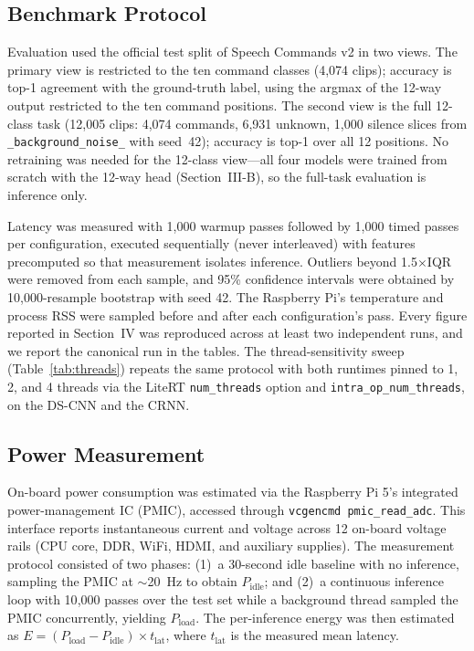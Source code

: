 \documentclass[conference,a4paper]{IEEEtran}
\begin{document}
\subsection{Benchmark Protocol}

Evaluation used the official test split of Speech Commands v2 in two views. The primary view is restricted to the ten command classes (4{,}074 clips); accuracy is top-1 agreement with the ground-truth label, using the argmax of the 12-way output restricted to the ten command positions. The second view is the full 12-class task (12{,}005 clips: 4{,}074 commands, 6{,}931 unknown, 1{,}000 silence slices from \texttt{\_background\_noise\_} with seed~42); accuracy is top-1 over all 12 positions. No retraining was needed for the 12-class view---all four models were trained from scratch with the 12-way head (Section~III-B), so the full-task evaluation is inference only.

Latency was measured with 1{,}000 warmup passes followed by 1{,}000 timed passes per configuration, executed sequentially (never interleaved) with features precomputed so that measurement isolates inference. Outliers beyond 1.5$\times$IQR were removed from each sample, and 95\% confidence intervals were obtained by 10{,}000-resample bootstrap with seed 42. The Raspberry Pi's temperature and process RSS were sampled before and after each configuration's pass. Every figure reported in Section~IV was reproduced across at least two independent runs, and we report the canonical run in the tables. The thread-sensitivity sweep (Table~\ref{tab:threads}) repeats the same protocol with both runtimes pinned to 1, 2, and 4 threads via the LiteRT \texttt{num\_threads} option and \texttt{intra\_op\_num\_threads}, on the DS-CNN and the CRNN.

\subsection{Power Measurement}
\label{sec:power}

On-board power consumption was estimated via the Raspberry Pi 5's integrated power-management IC (PMIC), accessed through \texttt{vcgencmd pmic\_read\_adc}. This interface reports instantaneous current and voltage across 12 on-board voltage rails (CPU core, DDR, WiFi, HDMI, and auxiliary supplies). The measurement protocol consisted of two phases: (1)~a 30-second idle baseline with no inference, sampling the PMIC at $\sim$20~Hz to obtain $P_\text{idle}$; and (2)~a continuous inference loop with 10{,}000 passes over the test set while a background thread sampled the PMIC concurrently, yielding $P_\text{load}$. The per-inference energy was then estimated as $E = (P_\text{load} - P_\text{idle}) \times t_\text{lat}$, where $t_\text{lat}$ is the measured mean latency.
\end{document}
